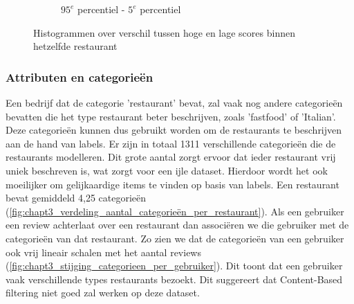 \begin{figure}[H]
\begin{subfigure}{.5\textwidth}
        \caption{$95^e$ percentiel - $5^e$ percentiel}
        \label{fig:chapt3_verdeling_score_min_max_percentiel_restaurant}
    \end{subfigure}
    \caption{Histogrammen over verschil tussen hoge en lage scores binnen hetzelfde restaurant}
    \label{fig:chapt3_verdeling_score_min_max_combined_restaurants}
\end{figure}

\subsubsection{Attributen en categorieën}
Een bedrijf dat de categorie 'restaurant' bevat, zal vaak nog andere categorieën bevatten die het type restaurant beter beschrijven, zoals 'fastfood' of 'Italian'. Deze categorieën kunnen dus gebruikt worden om de restaurants te beschrijven aan de hand van labels. Er zijn in totaal 1311 verschillende categorieën die de restaurants modelleren. Dit grote aantal zorgt ervoor dat ieder restaurant vrij uniek beschreven is, wat zorgt voor een ijle dataset. Hierdoor wordt het ook moeilijker om gelijkaardige items te vinden op basis van labels. Een restaurant bevat gemiddeld 4,25 categorieën (\autoref{fig:chapt3_verdeling_aantal_categorieën_per_restaurant}).\newline
Als een gebruiker een review achterlaat over een restaurant dan associëren we die gebruiker met de categorieën van dat restaurant. Zo zien we dat de categorieën van een gebruiker ook vrij lineair schalen met het aantal reviews (\autoref{fig:chapt3_stijging_categorieen_per_gebruiker}). Dit toont dat een gebruiker vaak verschillende types restaurants bezoekt. Dit suggereert dat Content-Based filtering niet goed zal werken op deze dataset.


